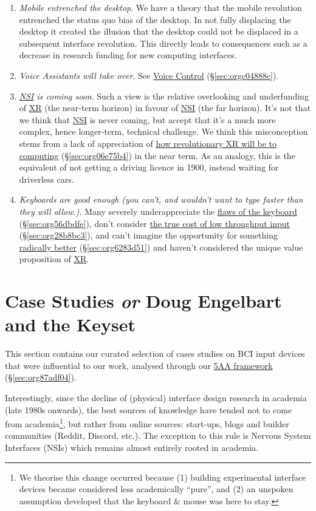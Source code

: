 \documentclass[logo,bsc,singlespacing,parskip]{infthesis}
\begin{document}
\begin{enumerate}
\item \emph{Mobile entrenched the desktop}.
We have a theory that the mobile revolution entrenched the status quo bias of the desktop.
In not fully displacing the desktop it created the illusion that the desktop could not be displaced in a subsequent interface revolution.
This directly leads to consequences such as a decrease in research funding for new computing interfaces.

\item \emph{Voice Assistants will take over}.
See \hyperref[sec:orgc04888c]{Voice Control} (\S \ref{sec:orgc04888c}).

\item \emph{\hyperref[org559faaa]{NSI} is coming soon}.
Such a view is the relative overlooking and underfunding of \hyperref[org88b0f70]{XR} (the near-term horizon) in favour of \hyperref[org559faaa]{NSI} (the far horizon).
It's not that we think that \hyperref[org559faaa]{NSI} is never coming, but accept that it's a much more complex, hence longer-term, technical challenge.
We think this misconception stems from a lack of appreciation of \hyperref[sec:org06e75b4]{how revolutionary XR will be to computing} (\S \ref{sec:org06e75b4}) in the near term.
As an analogy, this is the equivalent of not getting a driving licence in 1900, instead waiting for driverless cars.

\item \emph{Keyboards are good enough (you can't, and wouldn't want to type faster than they will allow.)}.
Many severely underappreciate the \hyperref[sec:org56dbdfe]{flaws of the keyboard} (\S \ref{sec:org56dbdfe}), don't consider \hyperref[sec:org28b8bc3]{the true cost of low throughput input} (\S \ref{sec:org28b8bc3}), and can't imagine the opportunity for something \hyperref[sec:org6283d51]{radically better} (\S \ref{sec:org6283d51}) and haven't considered the unique value proposition of \hyperref[org88b0f70]{XR}.
\end{enumerate}

\part{Case Studies \emph{or} Doug Engelbart and the Keyset}
\label{sec:org8c5f1d6}
This section contains our curated selection of cases studies on BCI input devices that were influential to our work, analysed through our \hyperref[sec:org87adf04]{5AA framework} (\S \ref{sec:org87adf04}).

Interestingly, since the decline of (physical) interface design research in academia (late 1980s onwards), the best sources of knowledge have tended not to come from academia\footnote{We theorise this change occurred because (1) building experimental interface devices became considered less academically ``pure'', and (2) an unspoken assumption developed that the keyboard \& mouse was here to stay.}, but rather from online sources: start-ups, blogs and builder communities (Reddit, Discord, etc.).
The exception to this rule is Nervous System Interfaces (NSIs) which remains almost entirely rooted in academia.
\end{document}
